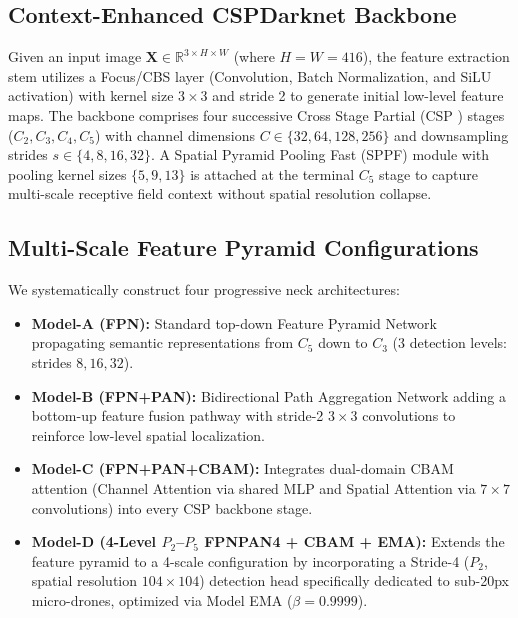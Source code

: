 \documentclass[conference]{IEEEtran}
\begin{document}
\subsection{Context-Enhanced CSPDarknet Backbone}
Given an input image $\mathbf{X} \in \mathbb{R}^{3 \times H \times W}$ (where $H=W=416$), the feature extraction stem utilizes a Focus/CBS layer (Convolution, Batch Normalization, and SiLU activation) with kernel size $3 \times 3$ and stride 2 to generate initial low-level feature maps. The backbone comprises four successive Cross Stage Partial (CSP \cite{wang2020cspnet}) stages ($C_2, C_3, C_4, C_5$) with channel dimensions $C \in \{32, 64, 128, 256\}$ and downsampling strides $s \in \{4, 8, 16, 32\}$. A Spatial Pyramid Pooling Fast (SPPF) module with pooling kernel sizes $\{5, 9, 13\}$ is attached at the terminal $C_5$ stage to capture multi-scale receptive field context without spatial resolution collapse.

\subsection{Multi-Scale Feature Pyramid Configurations}
We systematically construct four progressive neck architectures:
\begin{itemize}
    \item \textbf{Model-A (FPN):} Standard top-down Feature Pyramid Network propagating semantic representations from $C_5$ down to $C_3$ (3 detection levels: strides $8, 16, 32$).
    \item \textbf{Model-B (FPN+PAN):} Bidirectional Path Aggregation Network adding a bottom-up feature fusion pathway with stride-2 $3 \times 3$ convolutions to reinforce low-level spatial localization.
    \item \textbf{Model-C (FPN+PAN+CBAM):} Integrates dual-domain CBAM attention (Channel Attention via shared MLP and Spatial Attention via $7 \times 7$ convolutions) into every CSP backbone stage.
    \item \textbf{Model-D (4-Level $P_2$--$P_5$ FPNPAN4 + CBAM + EMA):} Extends the feature pyramid to a 4-scale configuration by incorporating a Stride-4 ($P_2$, spatial resolution $104 \times 104$) detection head specifically dedicated to sub-20px micro-drones, optimized via Model EMA ($\beta = 0.9999$).
\end{itemize}
\end{document}
